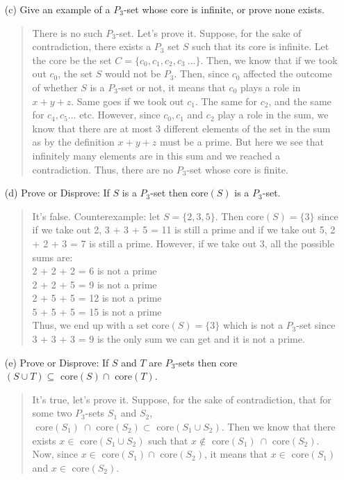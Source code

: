 \documentclass[12pt, a4paper]{article}                      %
\begin{document}
\begin{itemize}
\begin{itemize}
\item[]

\item[(c)]
Give an example of a $P_3$-set whose core is infinite, or prove none exists.
\begin{quote}
There is no such $P_3$-set. Let's prove it. Suppose, for the sake of contradiction, there exists a $P_3$ set $S$ such that its core is infinite. Let the core be the set $C = \{c_0, c_1, c_2, c_3 \ ...\}$.
Then, we know that if we took out $c_0$, the set $S$ would not be $P_3$.
Then, since $c_0$ affected the outcome of whether $S$ is a $P_3$-set or not, it means that $c_0$ plays a role in $x + y + z$. Same goes if we took out $c_1$. The same for $c_2$, and the same for $c_4, c_5...$ etc.
However, since $c_0, c_1$ and $c_2$ play a role in the sum, we know that there are at most 3 different elements of the set in the sum as by the definition $x + y + z$ must be a prime. But here we see that infinitely many elements are in this sum and we reached a contradiction.
Thus, there are no $P_3$-set whose core is finite.
\end{quote}

\item[]

\item[(d)]
Prove or Disprove: If $S$ is a $P_3$-set then core$(S)$ is a $P_3$-set. 
\begin{quote}
It's false. Counterexample: let $S = \{2, 3, 5\}$. Then core$(S) = \{3\}$ since if we take out 2, 3 + 3 + 5 = 11 is still a prime and if we take out 5, 2 + 2 + 3 = 7 is still a prime. However, if we take out 3, all the possible sums are:\\
2 + 2 + 2 = 6 is not a prime\\
2 + 2 + 5 = 9 is not a prime\\
2 + 5 + 5 = 12 is not a prime\\
5 + 5 + 5 = 15 is not a prime\\

Thus, we end up with a set core$(S) = \{3\}$ which is not a $P_3$-set since 3 + 3 + 3 = 9 is the only sum we can get and it is not a prime.
\end{quote}

\item[]

\item[(e)]
Prove or Disprove: If $S$ and $T$ are $P_3$-sets then core$(S \cup T) \subseteq \mbox{ core}(S) \cap \mbox{ core}(T)$.
\begin{quote}
It's true, let's prove it. Suppose, for the sake of contradiction, that for some two $P_3$-sets $S_1$ and $S_2$,
$\mbox{ core}(S_1) \ \cap \mbox{ core}(S_2) \subset  \mbox{ core}(S_1 \cup S_2)$. Then we know that there exists $x \in$ core$(S_1 \cup S_2)$ such that $x \notin \mbox{ core}(S_1) \ \cap \mbox{ core}(S_2)$. Now, since $x \in \mbox{ core}(S_1) \cap \mbox{ core}(S_2)$, it means that $x \in \mbox{ core}(S_1)$ and $x \in \mbox{ core}(S_2)$.
\end{quote} 


\end{itemize}
\end{itemize}
\end{document}
